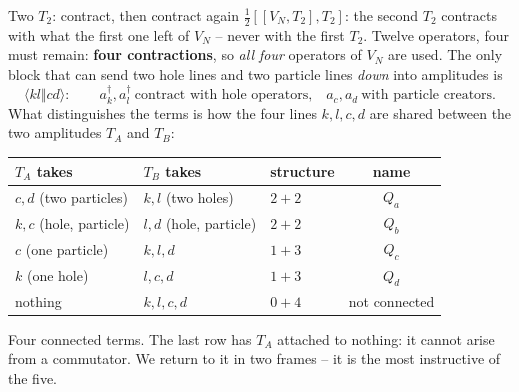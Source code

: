 \documentclass[aspectratio=169,10pt]{beamer}
\newcommand{\cre}[1]{a_{#1}^{\dagger}}
\newcommand{\ann}[1]{a_{#1}}
\newcommand{\as}[4]{\langle #1#2\Vert #3#4\rangle}
\begin{document}
\begin{frame}[shrink=3]{Two $T_2$: contract, then contract again}
\small
$\tfrac12[[V_N,T_2],T_2]$: the second $T_2$ contracts with what the first one left of $V_N$ -- never with the first $T_2$. Twelve operators, four must remain: \textbf{four contractions}, so \emph{all four} operators of $V_N$ are used. The only block that can send two hole lines and two particle lines \emph{down} into amplitudes is
\[
 \as klcd:\qquad \cre k,\cre l\ \text{contract with hole operators,}\quad \ann c,\ann d\ \text{with particle creators.}
\]
What distinguishes the terms is how the four lines $k,l,c,d$ are shared between the two amplitudes $T_A$ and $T_B$:
\begin{center}
\renewcommand{\arraystretch}{1.3}
\begin{tabular}{lllc}
\toprule
$T_A$ takes & $T_B$ takes & structure & name\\
\midrule
$c,d$ (two particles) & $k,l$ (two holes) & $2+2$ & $Q_a$\\
$k,c$ (hole, particle) & $l,d$ (hole, particle) & $2+2$ & $Q_b$\\
$c$ (one particle) & $k,l,d$ & $1+3$ & $Q_c$\\
$k$ (one hole) & $l,c,d$ & $1+3$ & $Q_d$\\
\midrule
nothing & $k,l,c,d$ & $0+4$ & \alert{not connected}\\
\bottomrule
\end{tabular}
\end{center}
Four connected terms. The last row has $T_A$ attached to nothing: it cannot arise from a commutator. We return to it in two frames -- it is the most instructive of the five.
\end{frame}
\end{document}
